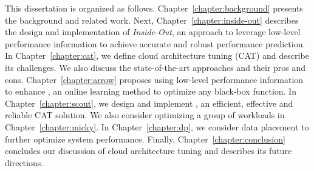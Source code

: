 This dissertation is organized as follows.
Chapter~\ref{chapter:background} presents the background and related work.
Next, Chapter~\ref{chapter:inside-out} describes the design and implementation
of \emph{Inside-Out}, an approach to leverage low-level performance information
to achieve accurate and robust performance prediction.
In Chapter~\ref{chapter:cat}, we define cloud architecture tuning (CAT) and
describe its challenges.
We also discuss the state-of-the-art approaches and their pros and cons.
Chapter~\ref{chapter:arrow} proposes using low-level performance information
to enhance \bo, an online learning method to optimize any black-box function.
In Chapter~\ref{chapter:scout}, we design and implement \scout
, an efficient, effective and reliable CAT solution.
We also consider optimizing a group of workloads in Chapter~\ref{chapter:micky}.
In Chapter~\ref{chapter:dp}, we consider data placement to further optimize system performance.
Finally, Chapter~\ref{chapter:conclusion} concludes our discussion of cloud architecture tuning
and describes its future directions.
